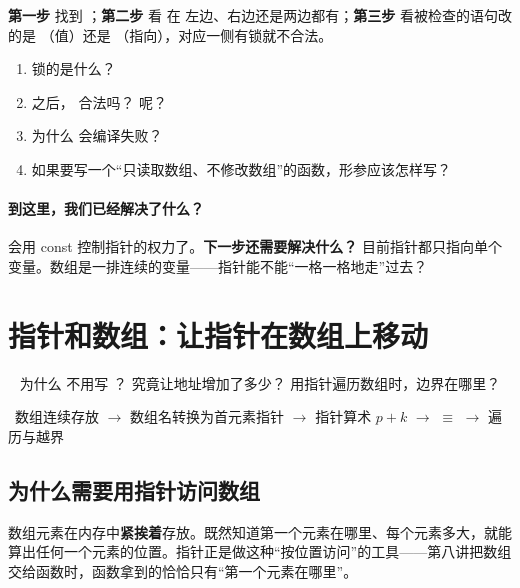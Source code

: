 \begin{summarybox}
\textbf{第一步} 找到 \cc{*}；\textbf{第二步} 看  在 \cc{*} 左边、右边还是两边都有；\textbf{第三步} 看被检查的语句改的是 （值）还是 （指向），对应一侧有锁就不合法。
\end{summarybox}

\begin{checkbox}
\begin{enumerate}[label=\arabic*.,itemsep=0pt]
  \item {} 锁的是什么？
  \item {} 之后， 合法吗？ 呢？
  \item 为什么  会编译失败？
  \item 如果要写一个“只读取数组、不修改数组”的函数，形参应该怎样写？
\end{enumerate}
\end{checkbox}

\paragraph{到这里，我们已经解决了什么？} 会用 const 控制指针的权力了。\textbf{下一步还需要解决什么？} 目前指针都只指向单个变量。数组是一排连续的变量——指针能不能“一格一格地走”过去？

\section{指针和数组：让指针在数组上移动}\label{sec:arr}
\  为什么  不用写 \cc{\&}？  究竟让地址增加了多少？ 用指针遍历数组时，边界在哪里？\par
{}\ 数组连续存放 $\to$ 数组名转换为首元素指针 $\to$ 指针算术 $p+k$ $\to$  $\equiv$  $\to$ 遍历与越界

\subsection{为什么需要用指针访问数组}
数组元素在内存中\textbf{紧挨着}存放。既然知道第一个元素在哪里、每个元素多大，就能算出任何一个元素的位置。指针正是做这种“按位置访问”的工具——第八讲把数组交给函数时，函数拿到的恰恰只有“第一个元素在哪里”。

